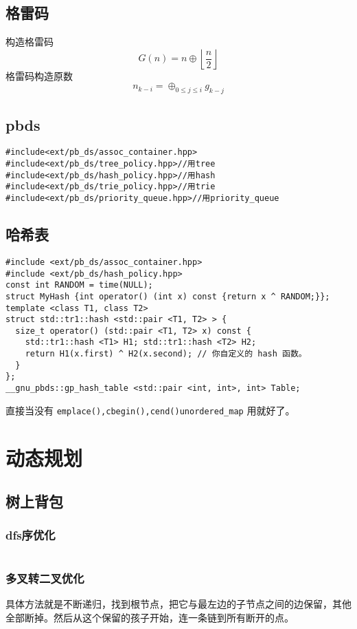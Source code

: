 \documentclass[titlepage, a4paper]{report}
\newcommand{\cppcode}[1]{  
    \inputminted[mathescape]{cpp}{source/#1}  
}
\begin{document}
\section{格雷码}
构造格雷码\\
$$
G(n)=n\oplus \left\lfloor\frac{n}{2}\right\rfloor
$$
格雷码构造原数\\
$$
n_{k-i}=\oplus_{0\le j \le i} g_{k-j}
$$

\section{pbds}
\begin{verbatim}  
#include<ext/pb_ds/assoc_container.hpp>
#include<ext/pb_ds/tree_policy.hpp>//用tree
#include<ext/pb_ds/hash_policy.hpp>//用hash
#include<ext/pb_ds/trie_policy.hpp>//用trie
#include<ext/pb_ds/priority_queue.hpp>//用priority_queue    
\end{verbatim}  

\section{哈希表}
\begin{verbatim}
#include <ext/pb_ds/assoc_container.hpp>
#include <ext/pb_ds/hash_policy.hpp>
const int RANDOM = time(NULL);
struct MyHash {int operator() (int x) const {return x ^ RANDOM;}};
template <class T1, class T2>
struct std::tr1::hash <std::pair <T1, T2> > {
  size_t operator() (std::pair <T1, T2> x) const {
    std::tr1::hash <T1> H1; std::tr1::hash <T2> H2;
    return H1(x.first) ^ H2(x.second); // 你自定义的 hash 函数。
  }
};
__gnu_pbds::gp_hash_table <std::pair <int, int>, int> Table;
\end{verbatim}
直接当没有 \texttt{emplace(),cbegin(),cend()}\texttt{unordered\_map} 用就好了。\\


\chapter{动态规划}
\section{树上背包}
\subsection{dfs序优化}
\cppcode{树上背包dfs.cpp}

\subsection{多叉转二叉优化}
具体方法就是不断递归，找到根节点，把它与最左边的子节点之间的边保留，其他全部断掉。然后从这个保留的孩子开始，连一条链到所有断开的点。\\
\cppcode{树上背包转二叉.cpp}
\end{document}
